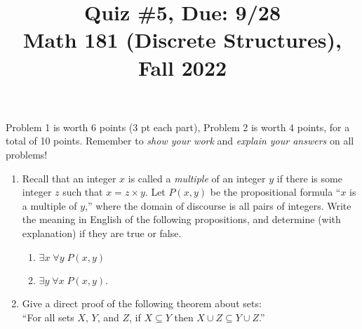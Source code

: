 \documentclass[11pt]{article}
\title{Quiz \#5, Due: 9/28 \\Math 181 (Discrete Structures), Fall 2022}
\date{}
\begin{document}
\maketitle

\thispagestyle{empty}

\vspace{-1cm}

Problem 1 is worth 6 points ($3$ pt each part), Problem 2 is worth 4 points, for a total of 10 points. Remember to \emph{show your work} and \emph{explain your answers} on all problems!

\begin{enumerate}
\item Recall that an integer $x$ is called a \emph{multiple} of an integer $y$ if there is some integer $z$ such that $x = z \times y$. Let $P(x,y)$ be the propositional formula ``$x$ is a multiple of $y$,'' where the domain of discourse is all pairs of integers. Write the meaning in English of the following propositions, and determine (with explanation) if they are true or false.
\begin{enumerate}
\item $\exists x \; \forall y \; P(x,y)$
\item $\exists y \; \forall x \; P(x,y)$.
\end{enumerate}

\item Give a direct proof of the following theorem about sets: \\ ``For all sets $X$, $Y$, and $Z$, if $X\subseteq Y$ then $X\cup Z \subseteq Y \cup Z$.''
\end{enumerate}
\end{document}
